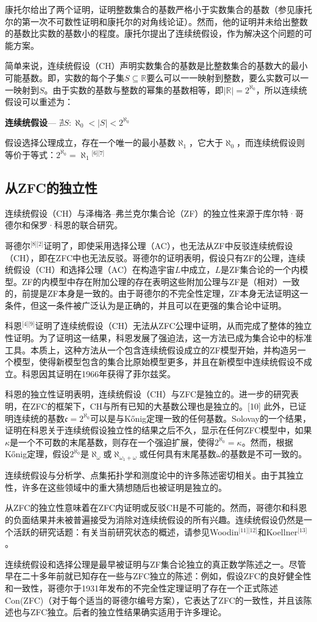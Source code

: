 康托尔给出了两个证明，证明整数集合的基数严格小于实数集合的基数（参见康托尔的第一次不可数性证明和康托尔的对角线论证）。然而，他的证明并未给出整数的基数比实数的基数小的程度。康托尔提出了连续统假设，作为解决这个问题的可能方案。

简单来说，连续统假设（CH）声明实数集合的基数是比整数集合的基数大的最小可能基数。即，实数的每个子集\( S \subseteq \mathbb{R} \)要么可以一一映射到整数，要么实数可以一一映射到\( S \)。由于实数的基数与整数的幂集的基数相等，即\( |\mathbb{R}| = 2^{\aleph_0} \)，所以连续统假设可以重述为：

\textbf{连续统假设}— \(\nexists S : \aleph_0 < |S| < 2^{\aleph_0}\)

假设选择公理成立，存在一个唯一的最小基数\( \aleph_1 \)，它大于\( \aleph_0 \)，而连续统假设则等价于等式：\(2^{\aleph_0} = \aleph_1\)\(^\text{[6][7]}\)
\subsection{从ZFC的独立性} 
连续统假设（CH）与泽梅洛–弗兰克尔集合论（ZF）的独立性来源于库尔特·哥德尔和保罗·科恩的联合研究。

哥德尔\(^\text{[8][2]}\)证明了，即使采用选择公理（AC），也无法从ZF中反驳连续统假设（CH），即在ZFC中也无法反驳。哥德尔的证明表明，假设只有ZF的公理，连续统假设（CH）和选择公理（AC）在构造宇宙\( L \)中成立，\( L \)是ZF集合论的一个内模型。ZF的内模型中存在附加公理的存在表明这些附加公理与ZF是（相对）一致的，前提是ZF本身是一致的。由于哥德尔的不完全性定理，ZF本身无法证明这一条件，但这一条件被广泛认为是正确的，并且可以在更强的集合论中证明。

科恩\(^\text{[4][9]}\)证明了连续统假设（CH）无法从ZFC公理中证明，从而完成了整体的独立性证明。为了证明这一结果，科恩发展了强迫法，这一方法已成为集合论中的标准工具。本质上，这种方法从一个包含连续统假设成立的ZF模型开始，并构造另一个模型，使得新模型包含的集合比原始模型更多，并且在新模型中连续统假设不成立。科恩因其证明在1966年获得了菲尔兹奖。

科恩的独立性证明表明，连续统假设（CH）与ZFC是独立的。进一步的研究表明，在ZFC的框架下，CH与所有已知的大基数公理也是独立的。[10] 此外，已证明连续统的基数\( \mathfrak{c} = 2^{\aleph_0} \)可以是与Kőnig定理一致的任何基数。Solovay的一个结果，证明在科恩关于连续统假设独立性的结果之后不久，显示在任何ZFC模型中，如果 \( \kappa \)是一个不可数的末尾基数，则存在一个强迫扩展，使得\( 2^{\aleph_0} = \kappa \)。然而，根据Kőnig定理，假设\( 2^{\aleph_0} \)是\( \aleph_\omega \)或\( \aleph_{\omega_1 + \omega} \)或任何具有末尾基数\( \omega \)的基数是不可一致的。

连续统假设与分析学、点集拓扑学和测度论中的许多陈述密切相关。由于其独立性，许多在这些领域中的重大猜想随后也被证明是独立的。

从ZFC的独立性意味着在ZFC内证明或反驳CH是不可能的。然而，哥德尔和科恩的负面结果并未被普遍接受为消除对连续统假设的所有兴趣。连续统假设仍然是一个活跃的研究话题：有关当前研究状态的概述，请参见Woodin\(^\text{[11][12]}\)和Koellner\(^\text{[13]}\)。

连续统假设和选择公理是最早被证明与ZF集合论独立的真正数学陈述之一。尽管早在二十多年前就已知存在一些与ZFC独立的陈述：例如，假设ZFC的良好健全性和一致性，哥德尔于1931年发布的不完全性定理证明了存在一个正式陈述Con(ZFC)（对于每个适当的哥德尔编号方案），它表达了ZFC的一致性，并且该陈述也与ZFC独立。后者的独立性结果确实适用于许多理论。